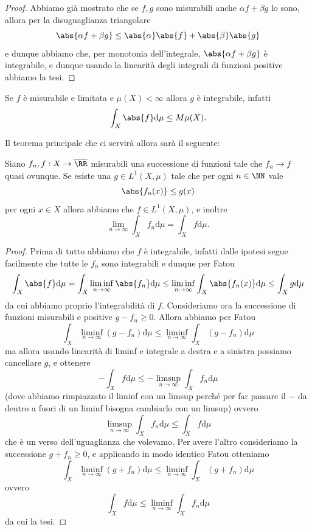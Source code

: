\documentclass[11pt]{scrartcl}
\newcommand{\dif}{\text{d}}
\begin{document}
	\begin{proof}
		Abbiamo già mostrato che se $f,g$ sono misurabili anche $\alpha f + \beta g$ lo sono, allora per la disuguaglianza triangolare
		$$\abs{\alpha f+ \beta g}\le \abs{\alpha}\abs{f}+\abs{\beta}\abs{g}$$
		e dunque abbiamo che, per monotonia dell'integrale, $\abs{\alpha f + \beta g}$ è integrabile, e dunque usando la linearità degli integrali di funzioni positive abbiamo la tesi.
	\end{proof}
	\begin{remark}
		Se $f$ è misurabile e limitata e $\mu(X)<\infty$ allora $g$ è integrabile, infatti 
		$$\int_X\abs{f}\dif \mu \le M \mu(X).$$
	\end{remark}
	Il teorema principale che ci servirà allora sarà il seguente:
	\begin{theorem}
		Siano $f_n,f:X\to \overline{\RR}$ misurabili una successione di funzioni tale che $f_n\to f$ quasi ovunque. Se esiste una $g\in L^1(X,\mu)$ tale che per ogni $n\in \NN$ vale
		$$\abs{f_n(x)}\le g(x)$$
		per ogni $x\in X$ allora abbiamo che $f\in L^1(X,\mu)$, e inoltre
		$$\lim_{n\to\infty}\int_X f_n\dif \mu = \int_X f \dif \mu.$$
	\end{theorem}
	\begin{proof}
		Prima di tutto abbiamo che $f$ è integrabile, infatti dalle ipotesi segue facilmente che tutte le $f_n$ sono integrabili e dunque per Fatou
		$$\int_X \abs{f}\dif \mu=\int_X \liminf_{n\to\infty}\abs{f_n}\dif \mu \le \liminf_{n\to\infty}\int_X \abs{f_n(x)}\dif \mu \le \int_X g\dif \mu$$
		da cui abbiamo proprio l'integrabilità di $f$. 
		Consideriamo ora la successione di funzioni misurabili e positive $g-f_n\ge 0$. Allora abbiamo per Fatou
		$$\int_X \liminf_{n\to\infty}\left(g-f_n\right)\dif \mu \le \liminf_{n\to\infty}\int_X \left(g-f_n\right)\dif \mu$$
		ma allora usando linearità di liminf e integrale a destra e a sinistra possiamo cancellare $g$, e ottenere 
		$$-\int_X f\dif \mu \le -\limsup_{n\to\infty}\int_X f_n\dif \mu  $$
		(dove abbiamo rimpiazzato il liminf con un limsup perché per far passare il $-$ da dentro a fuori di un liminf bisogna cambiarlo con un limsup) ovvero
		$$\limsup_{n\to\infty}\int_X f_n \dif \mu \le \int_X f \dif \mu$$
		che è un verso dell'uguaglianza che volevamo. Per avere l'altro consideriamo la successione $g+f_n\ge 0$, e applicando in modo identico Fatou otteniamo
		$$\int_X\liminf_{n\to\infty} \left(g+f_n\right)\dif \mu\le \liminf_{n\to\infty}\int_X \left(g+f_n\right)\dif \mu$$
		ovvero
		$$\int_X f\dif \mu \le \liminf_{n\to\infty}\int_X f_n\dif \mu$$
		da cui la tesi.
	\end{proof}
\end{document}
